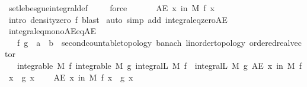 \begin{isabellebody}
\ set{\isacharunderscore}{\kern0pt}lebesgue{\isacharunderscore}{\kern0pt}integral{\isacharunderscore}{\kern0pt}def\ \isamarkupfalse%
\ {\isacharasterisk}{\kern0pt}\ \isamarkupfalse%
\ force\isanewline
\ \ \isacommand{{\isacharbraceright}{\kern0pt}}\isamarkupfalse%
\isanewline
\ \ \isamarkupfalse%
\ {\isachardoublequoteopen}AE\ x\ in\ M{\isachardot}{\kern0pt}\ f\ x\ {\isacharequal}{\kern0pt}\ {}{\isachardoublequoteclose}\ \isamarkupfalse%
\ {\isacharparenleft}{\kern0pt}intro\ density{\isacharunderscore}{\kern0pt}zero\ f{\isacharcomma}{\kern0pt}\ blast{\isacharparenright}{\kern0pt}\isanewline
{}\isamarkupfalse%
\ {\isacharparenleft}{\kern0pt}auto\ simp\ add{\isacharcolon}{\kern0pt}\ integral{\isacharunderscore}{\kern0pt}eq{\isacharunderscore}{\kern0pt}zero{\isacharunderscore}{\kern0pt}AE{\isacharparenright}{\kern0pt}%
\endisatagproof
{\isafoldproof}%
%
\isadelimproof
\isanewline
%
\endisadelimproof
\isanewline
{}\isamarkupfalse%
\ integral{\isacharunderscore}{\kern0pt}eq{\isacharunderscore}{\kern0pt}mono{\isacharunderscore}{\kern0pt}AE{\isacharunderscore}{\kern0pt}eq{\isacharunderscore}{\kern0pt}AE{\isacharcolon}{\kern0pt}\isanewline
\ \ \ f\ g\ {\isacharcolon}{\kern0pt}{\isacharcolon}{\kern0pt}\ {\isachardoublequoteopen}{\isacharprime}{\kern0pt}a\ {\isasymRightarrow}\ {\isacharprime}{\kern0pt}b\ {\isacharcolon}{\kern0pt}{\isacharcolon}{\kern0pt}\ {\isacharbraceleft}{\kern0pt}second{\isacharunderscore}{\kern0pt}countable{\isacharunderscore}{\kern0pt}topology{\isacharcomma}{\kern0pt}\ banach{\isacharcomma}{\kern0pt}\ linorder{\isacharunderscore}{\kern0pt}topology{\isacharcomma}{\kern0pt}\ ordered{\isacharunderscore}{\kern0pt}real{\isacharunderscore}{\kern0pt}vector{\isacharbraceright}{\kern0pt}{\isachardoublequoteclose}\isanewline
\ \ \ {\isachardoublequoteopen}integrable\ M\ f{\isachardoublequoteclose}\ {\isachardoublequoteopen}integrable\ M\ g{\isachardoublequoteclose}\ {\isachardoublequoteopen}integral\isactrlsup L\ M\ f\ {\isacharequal}{\kern0pt}\ integral\isactrlsup L\ M\ g{\isachardoublequoteclose}\ {\isachardoublequoteopen}AE\ x\ in\ M{\isachardot}{\kern0pt}\ f\ x\ {\isasymle}\ g\ x{\isachardoublequoteclose}\ \isanewline
\ \ \ {\isachardoublequoteopen}AE\ x\ in\ M{\isachardot}{\kern0pt}\ f\ x\ {\isacharequal}{\kern0pt}\ g\ x{\isachardoublequoteclose}\isanewline
%
\isadelimproof
%
\endisadelimproof
%
\isatagproof
{}\isamarkupfalse%
\ {\isacharminus}{\kern0pt}\isanewline
\ \ \isamarkupfalse%

\end{isabellebody}
